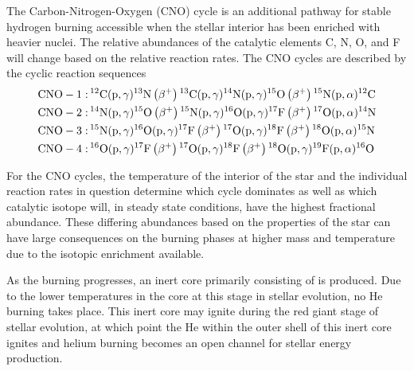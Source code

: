 
The Carbon-Nitrogen-Oxygen (CNO) cycle is an additional pathway for
stable hydrogen burning accessible when the stellar interior has been
enriched with heavier nuclei. The relative abundances of the catalytic
elements C, N, O, and F will change based on the relative reaction
rates. The CNO cycles are described by the cyclic reaction sequences
\begin{align*}
    \rm{CNO-1:\,}& {}^{12}\textrm{C}(\rm{p},\gamma){}^{13}\textrm{N}
        \left(\beta^+\right){}^{13}\textrm{C}(\rm{p},\gamma)
            {}^{14}\textrm{N}(\rm{p},\gamma){}^{15}\textrm{O}
        \left(\beta^+\right){}^{15}\textrm{N}(\rm{p},\alpha){}^{12}\textrm{C} \\
    \rm{CNO-2:\,}& {}^{14}\textrm{N}(\rm{p},\gamma){}^{15}\textrm{O}
        \left(\beta^+\right){}^{15}\textrm{N}(\rm{p},\gamma)
        {}^{16}\textrm{O}(\rm{p},\gamma){}^{17}\textrm{F}\left(\beta^+\right)
        {}^{17}\textrm{O}(\rm{p},\alpha){}^{14}\textrm{N} \\
    \rm{CNO-3:\,}& {}^{15}\textrm{N}(\rm{p},\gamma)
        {}^{16}\textrm{O}(\rm{p},\gamma){}^{17}\textrm{F}\left(\beta^+\right)
        {}^{17}\textrm{O}(\rm{p},\gamma){}^{18}\textrm{F}\left(\beta^+\right)
        {}^{18}\textrm{O}(\rm{p},\alpha){}^{15}\textrm{N} \\
    \rm{CNO-4:\,}& {}^{16}\textrm{O}(\rm{p},\gamma){}^{17}\textrm{F}\left(\beta^+\right)
        {}^{17}\textrm{O}(\rm{p},\gamma){}^{18}\textrm{F}\left(\beta^+\right)
        {}^{18}\textrm{O}(\rm{p},\gamma)
            {}^{19}\textrm{F}(\rm{p},\alpha){}^{16}\textrm{O}
\end{align*}

For the CNO cycles, the temperature of the interior of the star and the
individual reaction rates in question determine which cycle dominates as
well as which catalytic isotope will, in steady state conditions, have
the highest fractional abundance. These differing abundances based on
the properties of the star can have large consequences on the burning
phases at higher mass and temperature due to the isotopic enrichment
available.

As the burning progresses, an inert core primarily consisting of
 is produced. Due to the lower temperatures in the core at
this stage in stellar evolution, no He burning takes place. This inert
core may ignite during the red giant stage of stellar evolution, at
which point the He within the outer shell of this inert core ignites and
helium burning becomes an open channel for stellar energy production.

